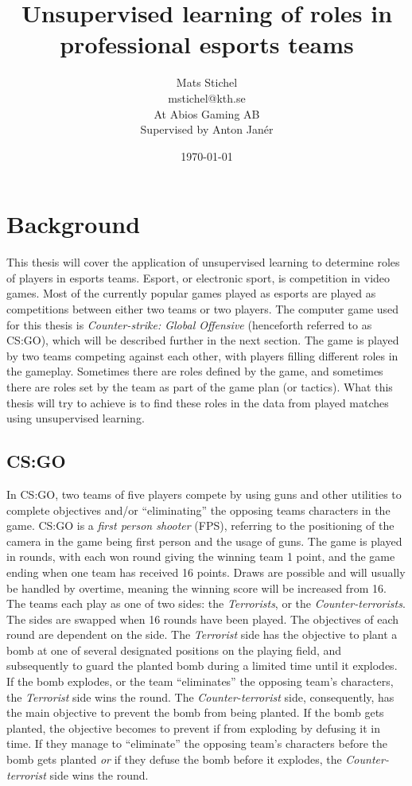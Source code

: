 \documentclass{article}
\title{Unsupervised learning of roles in professional esports teams}
\author{Mats Stichel \\ mstichel@kth.se \\ At Abios Gaming AB \\ Supervised by Anton Janér}
\date{\today}
\begin{document}
\maketitle

\section{Background}
This thesis will cover the application of unsupervised learning to determine roles of players in esports teams. Esport, or electronic sport, is competition in video games. Most of the currently popular games played as esports are played as competitions between either two teams or two players. The computer game used for this thesis is {\it Counter-strike: Global Offensive} (henceforth referred to as CS:GO), which will be described further in the next section. The game is played by two teams competing against each other, with players filling different roles in the gameplay. Sometimes there are roles defined by the game, and sometimes there are roles set by the team as part of the game plan (or tactics). What this thesis will try to achieve is to find these roles in the data from played matches using unsupervised learning.

\subsection{CS:GO}
In CS:GO, two teams of five players compete by using guns and other utilities to complete objectives and/or ``eliminating'' the opposing teams characters in the game. CS:GO is a {\it first person shooter} (FPS), referring to the positioning of the camera in the game being first person and the usage of guns. The game is played in rounds, with each won round giving the winning team 1 point, and the game ending when one team has received 16 points. Draws are possible and will usually be handled by overtime, meaning the winning score will be increased from 16. The teams each play as one of two sides: the {\it Terrorists}, or the {\it Counter-terrorists}. The sides are swapped when 16 rounds have been played. The objectives of each round are dependent on the side. The {\it Terrorist} side has the objective to plant a bomb at one of several designated positions on the playing field, and subsequently to guard the planted bomb during a limited time until it explodes. If the bomb explodes, or the team ``eliminates'' the opposing team's characters, the {\it Terrorist} side wins the round. The {\it Counter-terrorist} side, consequently, has the main objective to prevent the bomb from being planted. If the bomb gets planted, the objective becomes to prevent if from exploding by defusing it in time. If they manage to ``eliminate'' the opposing team's characters before the bomb gets planted {\it or} if they defuse the bomb before it explodes, the {\it Counter-terrorist} side wins the round.
\end{document}

